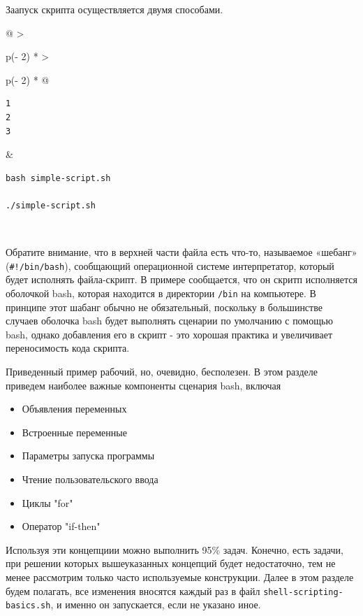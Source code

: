 \documentclass{report}
\begin{document}
Заапуск скрипта осуществляется двумя способами.

\begin{longtable}[]{@{}
  >{\raggedright\arraybackslash}p{(\columnwidth - 2\tabcolsep) * }
  >{\raggedright\arraybackslash}p{(\columnwidth - 2\tabcolsep) * }@{}}
\toprule
\endhead
\begin{minipage}[t]{\linewidth}\raggedright
\begin{verbatim}
1
2
3
\end{verbatim}
\end{minipage} & \begin{minipage}[t]{\linewidth}\raggedright
\begin{verbatim}
bash simple-script.sh

./simple-script.sh
\end{verbatim}
\end{minipage} \\ \addlinespace
\bottomrule
\end{longtable}

Обратите внимание, что в верхней части файла есть что-то, называемое
«шебанг» (\texttt{\#!/bin/bash}), сообщающий операционной системе
интерпретатор, который будет исполнять файла-скрипт. В примере
сообщается, что он скритп исполняется оболочкой bash, которая находится
в директории \texttt{/bin} на компьютере. В принципе этот шабанг обычно
не обязательный, поскольку в большинстве случаев оболочка bash будет
выполнять сценарии по умолчанию с помощью bash, однако добавления его в
скрипт - это хорошая практика и увеличивает переносимость кода скрипта.

Приведенный пример рабочий, но, очевидно, бесполезен. В этом разделе
приведем наиболее важные компоненты сценария bash, включая

\begin{itemize}
\tightlist
\item
  Объявления переменных
\item
  Встроенные переменные
\item
  Параметры запуска программы
\item
  Чтение пользовательского ввода
\item
  Циклы "for"
\item
  Оператор "if-then"
\end{itemize}

Используя эти концепциии можно выполнить 95\% задач. Конечно, есть
задачи, при решении которых вышеуказанных концепций будет недостаточно,
тем не менее рассмотрим только часто используемые конструкции. Далее в
этом разделе будем полагать, все изменения вносятся каждый раз в файл
\texttt{shell-scripting-basics.sh}, и именно он запускается, если не
указано иное.
\end{document}
